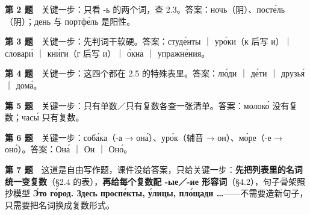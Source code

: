\textbf{第 2 题}　关键一步：只看 -ь 的两个词，查 2.3。答案：ночь（阴）、посте́ль（阴）；день 与 портфе́ль 是阳性。

\textbf{第 3 题}　关键一步：先判词干软硬。答案：студе́нты ｜ уро́ки（к 后写 и）｜ словари́ ｜ кни́ги（г 后写 и）｜ о́кна ｜ упражне́ния。

\textbf{第 4 题}　关键一步：这四个都在 2.5 的特殊表里。答案：лю́ди ｜ де́ти ｜ друзья́ ｜ дома́。

\textbf{第 5 题}　关键一步：只有单数／只有复数各查一张清单。答案：молоко́ 没有复数；часы́ 只有复数。

\textbf{第 6 题}　关键一步：соба́ка（-а → она́）、уро́к（辅音 → он）、мо́ре（-е → оно́）。答案：Она́ ｜ Он ｜ Оно́。

\textbf{第 7 题}　这道是自由写作题，课件没给答案，只给关键一步：\textbf{先把列表里的名词统一变复数}（\S2.4 的表），\textbf{再给每个复数配 -ые／-ие 形容词}（\S4.2），句子骨架照抄模型 \textbf{Э́то го́род. Здесь проспе́кты, у́лицы, пло́щади …}——不需要造新句子，只需要把名词换成复数形式。
